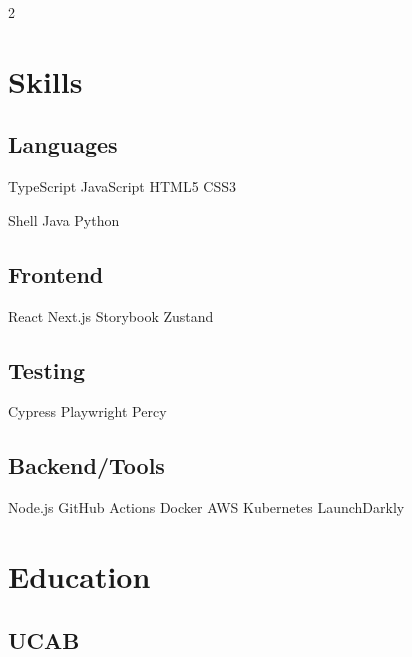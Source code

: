 \documentclass[]{main}
\begin{document}
\begin{paracol}{2}
\additionalinfo
\lastupdated

%
%

\switchcolumn[1]


\section{Skills}
\subsection{Languages}
\sectionsep
TypeScript \textbullet{} JavaScript \textbullet{} HTML5 \textbullet{} CSS3
\par\sectionsep
{}
Shell \textbullet{} Java \textbullet{} Python
\sectionsep
\sectionsep
\subsection{Frontend}
\sectionsep
React \textbullet{} Next.js \textbullet{} Storybook \textbullet{} Zustand
\sectionsep
\sectionsep
\subsection{Testing}
\sectionsep
Cypress \textbullet{} Playwright \textbullet{} Percy
\sectionsep
\sectionsep
\subsection{Backend/Tools}
\sectionsep
Node.js \textbullet{} GitHub Actions \textbullet{} Docker \textbullet{} AWS \textbullet{} Kubernetes \textbullet{} LaunchDarkly
\sectionsep


\section{Education} 
\subsection{UCAB}
\sectionsep



\end{paracol}
\end{document}
